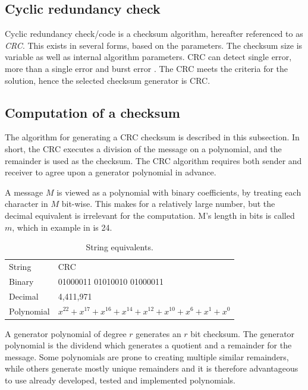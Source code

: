 \subsection*{Cyclic redundancy check}
Cyclic redundancy check/code is a checksum algorithm, hereafter referenced to as \textit{CRC}. This exists in several forms, based on the parameters. The checksum size is variable as well as internal algorithm parameters.  CRC can detect single error, more than a single error and burst error \cite[p.~31]{elahi2001network}. The CRC meets the criteria for the solution, hence the selected checksum generator is CRC.

\subsection{Computation of a checksum}
The algorithm for generating a CRC checksum is described in this subsection.
In short, the CRC executes a division of the message on a polynomial, and the remainder is used as the checksum. 
The CRC algorithm requires both sender and receiver to agree upon a generator polynomial in advance.

A message $M$ is viewed as a polynomial with binary coefficients, by treating each character in $M$ bit-wise. This makes for a relatively large number, but the decimal equivalent is irrelevant for the computation. M's length in bits is called $m$, which in example in  is 24.

\begin{table}[h!]
	\centering
	\begin{tabular}{ll}
		String  & CRC                        \\
		Binary  & 01000011 01010010 01000011 \\
		Decimal & 4,411,971                  \\
		Polynomial & $x^{22} + x^{17} + x^{16} + x^{14} + x^{12} + x^{10} + x^{6} + x^{1} + x^{0}$
	\end{tabular}
	\caption{String equivalents.}
	\label{tab:string}
\end{table}

A generator polynomial of degree $r$ generates an $r$ bit checksum. The generator polynomial is the dividend which generates a quotient and a remainder for the message. Some polynomials are prone to creating multiple similar remainders, while others generate mostly unique remainders and it is therefore advantageous to use already developed, tested and implemented polynomials.

